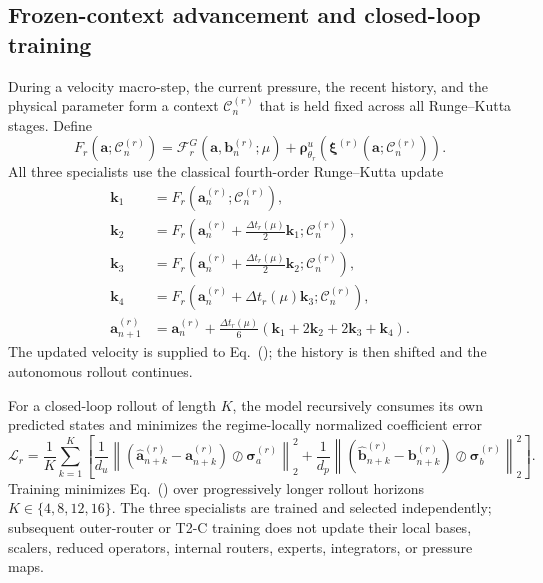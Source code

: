 \subsection{Frozen-context advancement and closed-loop training}

During a velocity macro-step, the current pressure, the recent history, and
the physical parameter form a context $\mathcal C_n^{(r)}$ that is held fixed
across all Runge--Kutta stages. Define
\begin{equation}
  F_r\!\left(\bm a;\mathcal C_n^{(r)}\right)
  =\mathcal F_r^G\!\left(\bm a,\bm b_n^{(r)};\mu\right)
   +\bm\rho^u_{\theta_r}\!\left(
      \bm\xi^{(r)}\!\left(\bm a;\mathcal C_n^{(r)}\right)
    \right).
  \label{eq:app_frozen_context_rhs}
\end{equation}
All three specialists use the classical fourth-order Runge--Kutta update
\begin{align}
  \bm k_1
  &=F_r\!\left(\bm a_n^{(r)};\mathcal C_n^{(r)}\right),\nonumber\\
  \bm k_2
  &=F_r\!\left(
      \bm a_n^{(r)}+\tfrac{\Delta t_r(\mu)}{2}\bm k_1;
      \mathcal C_n^{(r)}
    \right),\nonumber\\
  \bm k_3
  &=F_r\!\left(
      \bm a_n^{(r)}+\tfrac{\Delta t_r(\mu)}{2}\bm k_2;
      \mathcal C_n^{(r)}
    \right),\nonumber\\
  \bm k_4
  &=F_r\!\left(
      \bm a_n^{(r)}+\Delta t_r(\mu)\bm k_3;
      \mathcal C_n^{(r)}
    \right),\nonumber\\
  \bm a_{n+1}^{(r)}
  &=\bm a_n^{(r)}
    +\frac{\Delta t_r(\mu)}{6}
      \left(\bm k_1+2\bm k_2+2\bm k_3+\bm k_4\right).
  \label{eq:app_unified_rk4}
\end{align}
The updated velocity is supplied to
Eq.~(); the history is then shifted and the
autonomous rollout continues.

For a closed-loop rollout of length $K$, the model recursively consumes its
own predicted states and minimizes the regime-locally normalized coefficient
error
\begin{equation}
  \mathcal L_r
  =\frac{1}{K}\sum_{k=1}^{K}\left[
    \frac{1}{d_u}
    \left\|
      \left(\widehat{\bm a}_{n+k}^{(r)}-\bm a_{n+k}^{(r)}\right)
      \oslash\bm\sigma_a^{(r)}
    \right\|_2^2
    +\frac{1}{d_p}
    \left\|
      \left(\widehat{\bm b}_{n+k}^{(r)}-\bm b_{n+k}^{(r)}\right)
      \oslash\bm\sigma_b^{(r)}
    \right\|_2^2
  \right].
  \label{eq:app_true_rollout_loss}
\end{equation}
Training minimizes Eq.~() over
progressively longer rollout horizons $K\in\{4,8,12,16\}$. The three specialists are
trained and selected independently; subsequent outer-router or T2-C training
does not update their local bases, scalers, reduced operators, internal
routers, experts, integrators, or pressure maps.

